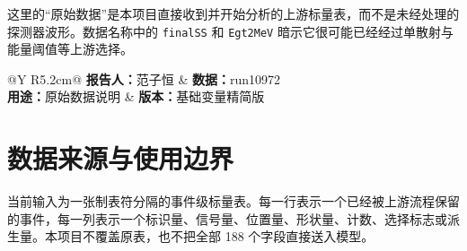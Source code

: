 \documentclass[UTF8,11pt,a4paper,oneside,fontset=none]{ctexart}
\begin{document}
\vspace{0.38cm}
\begin{scopebox}[title={“原始数据”的准确含义}]
这里的“原始数据”是本项目直接收到并开始分析的上游标量表，而不是未经处理的探测器波形。数据名称中的 \texttt{finalSS} 和 \texttt{Egt2MeV} 暗示它很可能已经经过单散射与能量阈值等上游选择。
\end{scopebox}

\vfill
\begin{tabularx}{\textwidth}{@{}Y R{5.2cm}@{}}
\textbf{报告人：}范子恒 & \textbf{数据：}run10972\\
\textbf{用途：}原始数据说明 & \textbf{版本：}基础变量精简版
\end{tabularx}
\vspace{0.30cm}
\noindent{\color{PandaTeal}\rule{\textwidth}{1.3pt}}
\clearpage

\section{数据来源与使用边界}

当前输入为一张制表符分隔的事件级标量表。每一行表示一个已经被上游流程保留的事件，每一列表示一个标识量、信号量、位置量、形状量、计数、选择标志或派生量。本项目不覆盖原表，也不把全部 188 个字段直接送入模型。
\end{document}
